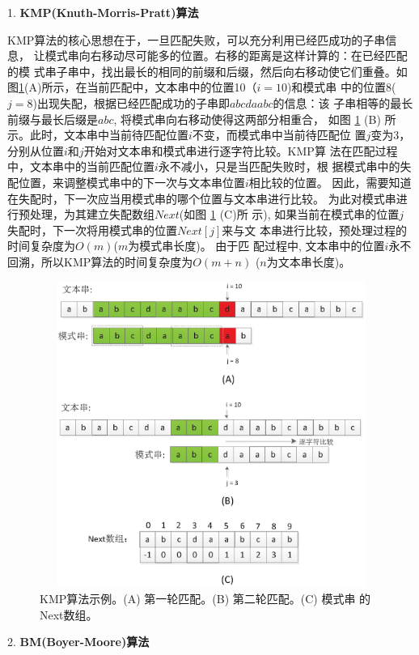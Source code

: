 1. \textbf{KMP(Knuth-Morris-Pratt)算法}

KMP算法的核心思想在于，一旦匹配失败，可以充分利用已经匹成功的子串信息，
让模式串向右移动尽可能多的位置。右移的距离是这样计算的：在已经匹配的模
式串子串中，找出最长的相同的前缀和后缀，然后向右移动使它们重叠。如
图\ref{fig:KMP}(A)所示，在当前匹配中，文本串中的位置10（$i=10$)和模式串
中的位置8($j=8$)出现失配，根据已经匹配成功的子串即$abcdaabc$的信息：该
子串相等的最长前缀与最长后缀是$abc$, 将模式串向右移动使得这两部分相重合，
如图 \ref{fig:KMP} (B)
所示。此时，文本串中当前待匹配位置$i$不变，而模式串中当前待匹配位
置$j$变为3，分别从位置$i$和$j$开始对文本串和模式串进行逐字符比较。KMP算
法在匹配过程中，文本串中的当前匹配位置$i$永不减小，只是当匹配失败时，根
据模式串中的失配位置，来调整模式串中的下一次与文本串位置$i$相比较的位置。
因此，需要知道在失配时，下一次应当用模式串的哪个位置与文本串进行比较。
为此对模式串进行预处理，为其建立失配数组$Next$(如图 \ref{fig:KMP} (C)所
示),
如果当前在模式串的位置$j$失配时，下一次将用模式串的位置$Next[j]$来与文
本串进行比较，预处理过程的时间复杂度为$O(m)$($m$为模式串长度)。 由于匹
配过程中, 文本串中的位置$i$永不回溯，所以KMP算法的时间复杂度为$O(m+n)$
($n$为文本串长度)。

\begin{figure}[!h]
  \centering
  \includegraphics[height=10cm ,width=12cm]{figures/1_Introduction/KMP.eps}
  \caption{KMP算法示例。(A) 第一轮匹配。(B) 第二轮匹配。(C) 模式串
    的Next数组。}
  \label{fig:KMP}
\end{figure}


2. \textbf{BM(Boyer-Moore)算法}

